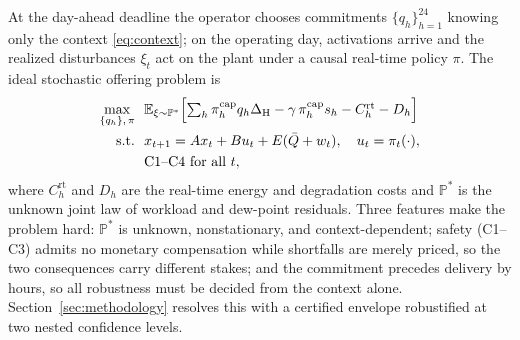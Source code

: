 At the day-ahead deadline the operator chooses commitments
$\{q_h\}_{h=1}^{24}$ knowing only the context \eqref{eq:context}; on the
operating day, activations arrive and the realized disturbances
$\xi_t$ act on the plant under a causal real-time policy $\pi$. The ideal
stochastic offering problem is
\begin{equation}
\begin{aligned}
\max_{\{q_h\},\,\pi}\ \
&\mathbb{E}_{\xi\sim\mathbb{P}^*}\Bigl[\textstyle\sum_h
 \pi^{\mathrm{cap}}_h q_h \Delta_{\mathrm{H}} - \gamma\,\pi^{\mathrm{cap}}_h s_h - C^{\mathrm{rt}}_h - D_h \Bigr]\\
\text{s.t.}\ \ & x_{t+1}=Ax_t+Bu_t+E(\bar Q+w_t),\quad u_t=\pi_t(\cdot),\\
& \text{C1--C4 for all } t,
\end{aligned}
\label{eq:stochastic_opt}
\end{equation}
where $C^{\mathrm{rt}}_h$ and $D_h$ are the real-time energy and degradation
costs and $\mathbb{P}^*$ is the unknown joint law of workload and dew-point
residuals. Three features make the problem hard: $\mathbb{P}^*$ is unknown,
nonstationary, and context-dependent; safety (C1--C3) admits no monetary
compensation while shortfalls are merely priced, so the two consequences
carry different stakes; and the commitment precedes delivery by hours, so
all robustness must be decided from the context alone.
Section~\ref{sec:methodology} resolves this with a certified envelope
robustified at two nested confidence levels.

\vspace{-2mm}
